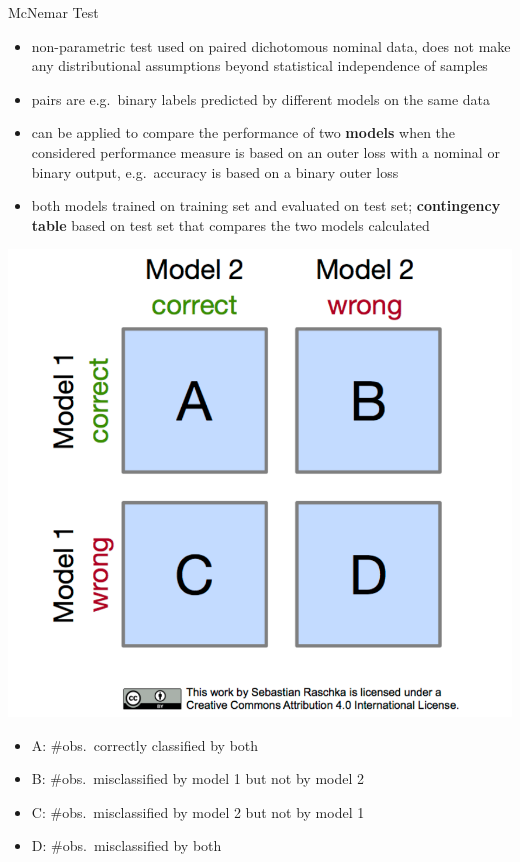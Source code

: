     \begin{frame}[c,allowframebreaks]{McNemar Test}
    \begin{itemize}
    \item non-parametric test used on paired dichotomous nominal data, does not
        make any distributional assumptions beyond statistical independence of
        samples
    \item pairs are e.g.\ binary labels predicted by different models on the same data
    \item can be applied to compare the performance of two \textbf{models}
        when the considered performance measure is based on an outer loss with a
        nominal or binary output, e.g.\ accuracy is based on a binary outer loss
    \item both models trained on training set and evaluated on test set;
        \textbf{contingency table} based on test set that compares the two models calculated
    \end{itemize}

    \medskip
    \begin{minipage}{0.25\textwidth}
    \includegraphics[width=\textwidth]{mcnemar_1.png}
    \end{minipage}
    \begin{minipage}{0.74\textwidth}
    \begin{itemize}
    \item A: $\#$obs.\ correctly classified by both
    \item B: $\#$obs.\ misclassified by model 1 but not by model 2
    \item C: $\#$obs.\ misclassified by model 2 but not by model 1
    \item D: $\#$obs.\ misclassified by both
    \end{itemize}
    \end{minipage}


\end{frame}
